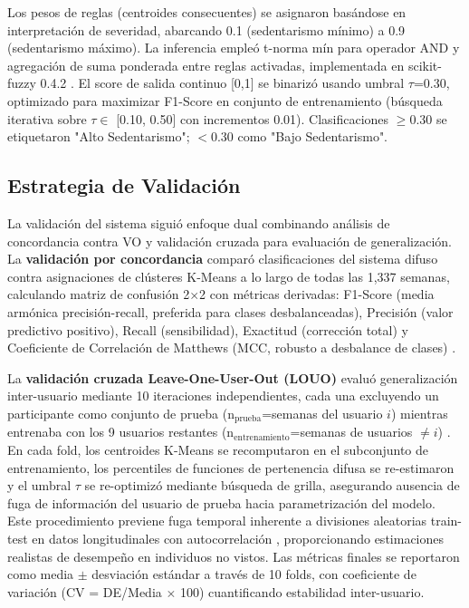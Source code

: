 Los pesos de reglas (centroides consecuentes) se asignaron basándose en interpretación de severidad, abarcando 0.1 (sedentarismo mínimo) a 0.9 (sedentarismo máximo). La inferencia empleó t-norma mín para operador AND y agregación de suma ponderada entre reglas activadas, implementada en scikit-fuzzy 0.4.2 \cite{Zadeh1965}. El score de salida continuo [0,1] se binarizó usando umbral $\tau$=0.30, optimizado para maximizar F1-Score en conjunto de entrenamiento (búsqueda iterativa sobre $\tau \in$ [0.10, 0.50] con incrementos 0.01). Clasificaciones $\geq$0.30 se etiquetaron "Alto Sedentarismo"; $<$0.30 como "Bajo Sedentarismo".

\subsection{Estrategia de Validación}
\label{subsec:validacion}

La validación del sistema siguió enfoque dual combinando análisis de concordancia contra VO y validación cruzada para evaluación de generalización. La \textbf{validación por concordancia} comparó clasificaciones del sistema difuso contra asignaciones de clústeres K-Means a lo largo de todas las 1,337 semanas, calculando matriz de confusión 2$\times$2 con métricas derivadas: F1-Score (media armónica precisión-recall, preferida para clases desbalanceadas), Precisión (valor predictivo positivo), Recall (sensibilidad), Exactitud (corrección total) y Coeficiente de Correlación de Matthews (MCC, robusto a desbalance de clases) \cite{Chicco2020,Powers2020}.

La \textbf{validación cruzada Leave-One-User-Out (LOUO)} evaluó generalización inter-usuario mediante 10 iteraciones independientes, cada una excluyendo un participante como conjunto de prueba (n$_{\text{prueba}}$=semanas del usuario $i$) mientras entrenaba con los 9 usuarios restantes (n$_{\text{entrenamiento}}$=semanas de usuarios $\neq i$) \cite{Varoquaux2017,Poldrack2020}. En cada fold, los centroides K-Means se recomputaron en el subconjunto de entrenamiento, los percentiles de funciones de pertenencia difusa se re-estimaron y el umbral $\tau$ se re-optimizó mediante búsqueda de grilla, asegurando ausencia de fuga de información del usuario de prueba hacia parametrización del modelo. Este procedimiento previene fuga temporal inherente a divisiones aleatorias train-test en datos longitudinales con autocorrelación \cite{Rehman2024LOSO}, proporcionando estimaciones realistas de desempeño en individuos no vistos. Las métricas finales se reportaron como media $\pm$ desviación estándar a través de 10 folds, con coeficiente de variación (CV = DE/Media $\times$ 100) cuantificando estabilidad inter-usuario.

